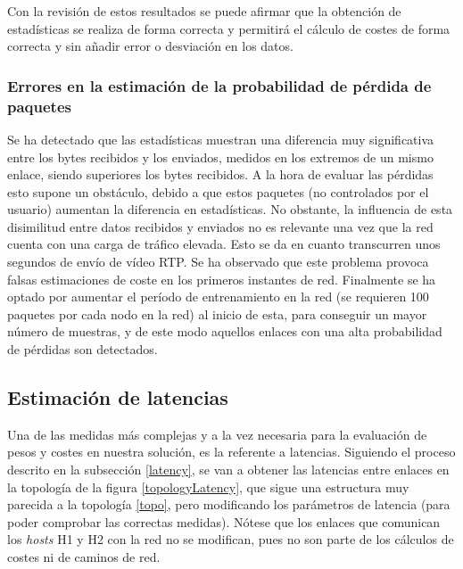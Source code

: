 \documentclass[a4paper,11pt]{book}
\begin{document}
Con la revisión de estos resultados se puede afirmar que la obtención de estadísticas se realiza de forma correcta y permitirá el cálculo de  costes de forma correcta y sin añadir error o desviación en los datos.


\subsubsection{Errores en la estimación de la probabilidad de pérdida de paquetes}

 Se ha detectado que las estadísticas muestran una diferencia muy significativa entre los bytes recibidos y los enviados, medidos en los extremos de un mismo enlace, siendo superiores los bytes recibidos. A la hora de evaluar las pérdidas esto supone un obstáculo, debido a que estos paquetes (no controlados por el usuario) aumentan la diferencia en estadísticas. No obstante, la influencia de esta disimilitud entre datos recibidos y enviados no es relevante una vez que la red cuenta con una carga de tráfico elevada. Esto se da en cuanto transcurren unos segundos de envío de vídeo \ac{RTP}. 
 Se ha observado que este problema provoca falsas estimaciones de coste en los primeros instantes de red. Finalmente se ha optado por aumentar el período de entrenamiento en la red (se requieren 100 paquetes por cada nodo en la red) al inicio de esta, para conseguir un mayor número de muestras, y de este modo aquellos enlaces con una alta probabilidad de pérdidas son detectados.


\subsection{Estimación de latencias}
\label{sec:eval-latencias}

Una de las medidas más complejas y a la vez necesaria para la evaluación de pesos y costes en nuestra solución, es la referente a latencias. Siguiendo el proceso descrito en la subsección \ref{latency}, se van a obtener las latencias entre enlaces en la topología de la figura \ref{topologyLatency}, que sigue una estructura muy parecida a la topología \ref{topo}, pero modificando los parámetros de latencia (para poder comprobar las correctas medidas). Nótese que los enlaces que comunican los \textit{hosts} H1 y H2 con la red no se modifican, pues no son parte de los cálculos de costes ni de caminos de red.
\end{document}
